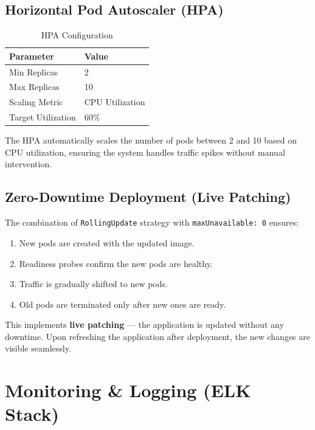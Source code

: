 \documentclass[12pt,a4paper]{article}
\begin{document}
\subsection{Horizontal Pod Autoscaler (HPA)}

\begin{table}[H]
\centering
\caption{HPA Configuration}
\begin{tabular}{@{}ll@{}}
\toprule
\textbf{Parameter} & \textbf{Value} \\
\midrule
Min Replicas & 2 \\
Max Replicas & 10 \\
Scaling Metric & CPU Utilization \\
Target Utilization & 60\% \\
\bottomrule
\end{tabular}
\end{table}

The HPA automatically scales the number of pods between 2 and 10 based on CPU utilization, ensuring the system handles traffic spikes without manual intervention.

\subsection{Zero-Downtime Deployment (Live Patching)}

The combination of \texttt{RollingUpdate} strategy with \texttt{maxUnavailable: 0} ensures:

\begin{enumerate}
    \item New pods are created with the updated image.
    \item Readiness probes confirm the new pods are healthy.
    \item Traffic is gradually shifted to new pods.
    \item Old pods are terminated only after new ones are ready.
\end{enumerate}

This implements \textbf{live patching} --- the application is updated without any downtime. Upon refreshing the application after deployment, the new changes are visible seamlessly.

\section{Monitoring \& Logging (ELK Stack)}
\end{document}
